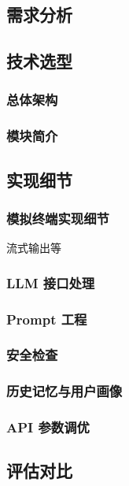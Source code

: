 \documentclass{article}
\theoremstyle{plain}
\theoremstyle{definition}
\theoremstyle{remark}
\begin{document}
\subsection{需求分析}


\subsection{技术选型}

\subsubsection{总体架构}

\subsubsection{模块简介}


\subsection{实现细节}

\subsubsection{模拟终端实现细节}

流式输出等

\subsubsection{LLM 接口处理}

\subsubsection{Prompt 工程}

\subsubsection{安全检查}

\subsubsection{历史记忆与用户画像}

\subsubsection{API 参数调优}


\subsection{评估对比}
\end{document}

